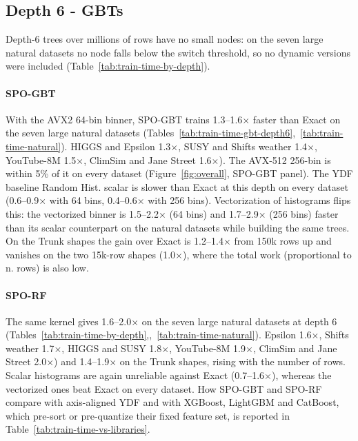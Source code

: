 \documentclass[sigconf,anonymous,review]{acmart}
\begin{document}
\subsection{Depth 6 - GBTs}
\label{sec:res-depth6}




Depth-6 trees over millions of rows have no small nodes: on the seven large natural datasets no node falls below the switch threshold, so no dynamic versions were included (Table~\ref{tab:train-time-by-depth}).

\paragraph{SPO-GBT} With the AVX2 64-bin binner, SPO-GBT trains 1.3--1.6$\times$ faster than Exact on the seven large natural datasets (Tables~\ref{tab:train-time-gbt-depth6},~\ref{tab:train-time-natural}). HIGGS and Epsilon 1.3$\times$, SUSY and Shifts weather 1.4$\times$, YouTube-8M 1.5$\times$, ClimSim and Jane Street 1.6$\times$). The AVX-512 256-bin is within 5\% of it on every dataset (Figure~\ref{fig:overall}, SPO-GBT panel). The YDF baseline Random Hist. scalar is slower than Exact at this depth on every dataset (0.6--0.9$\times$ with 64 bins, 0.4--0.6$\times$ with 256 bins). Vectorization of histograms flips this: the vectorized binner is 1.5--2.2$\times$ (64 bins) and 1.7--2.9$\times$ (256 bins) faster than its scalar counterpart on the natural datasets while building the same trees. On the Trunk shapes the gain over Exact is 1.2--1.4$\times$ from 150k rows up and vanishes on the two 15k-row shapes (1.0$\times$), where the total work (proportional to n. rows) is also low.

\paragraph{SPO-RF} The same kernel gives 1.6--2.0$\times$ on the seven large natural datasets at depth 6 (Tables~\ref{tab:train-time-by-depth},,~\ref{tab:train-time-natural}). Epsilon 1.6$\times$, Shifts weather 1.7$\times$, HIGGS and SUSY 1.8$\times$, YouTube-8M 1.9$\times$, ClimSim and Jane Street 2.0$\times$) and 1.4--1.9$\times$ on the Trunk shapes, rising with the number of rows. Scalar histograms are again unreliable against Exact (0.7--1.6$\times$), whereas the vectorized ones beat Exact on every dataset. How SPO-GBT and SPO-RF compare with axis-aligned YDF and with XGBoost, LightGBM and CatBoost, which pre-sort or pre-quantize their fixed feature set, is reported in Table~\ref{tab:train-time-vs-libraries}.
\end{document}
